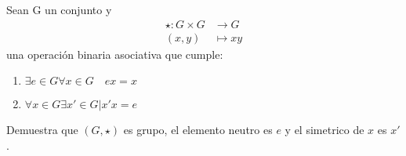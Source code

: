 \question Sean G un conjunto y
\begin{align*}
\star: G\times G &\to G \\
(x,y) &\mapsto xy
\end{align*}
una operación binaria asociativa que cumple:
\begin{enumerate}
\item $\exists {e \in G} \forall x \in G \quad ex = x$
\item $\forall x \in G \exists x' \in G | x'x=e$
\end{enumerate}
Demuestra que $(G,\star)$ es grupo, el elemento neutro es $e$ y el simetrico de $x$ es $x'$.